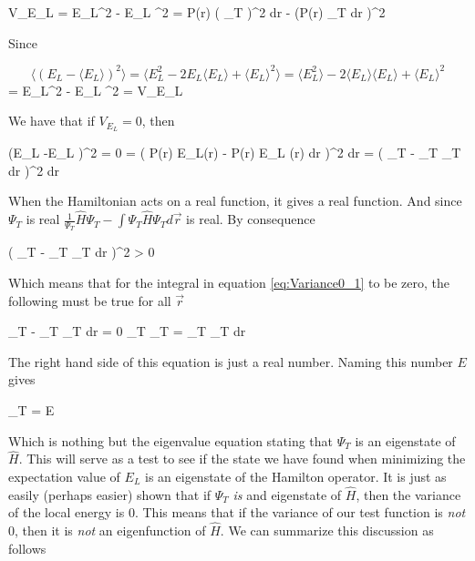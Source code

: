 \eqs
V_{E_L} = \langle E_L^2 \rangle - \langle E_L \rangle^2
= 
\int P(\vec r) \left (  \Psi_T \right )^2 d\vec r -
\left (\int P(\vec r)   \Psi_T d\vec r \right )^2
\eqf 

Since

\[
\langle (E_L -\langle E_L \rangle)^2 \rangle = \langle E_L^2 - 2 E_L \langle E_L \rangle + \langle E_L \rangle^2 \rangle 
=  
\langle E_L^2 \rangle - 2 \langle E_L \rangle \langle E_L \rangle + \langle E_L \rangle^2
\]
\eqs
= \langle E_L^2 \rangle - \langle E_L \rangle^2 
=
V_{E_L}
\eqf

We have that if $V_{E_L} = 0$, then 

\eqs
\langle (E_L -\langle E_L \rangle)^2 \rangle = 0
\eqf
{} = \int  \left (  P(\vec r) E_L(\vec r) -  \int P(\vec r) E_L (\vec r) d\vec r \right )^2 d\vec r = 
\int \left (
  \Psi_T  - \int \Psi_T  \Psi_T d\vec r 
\right )^2 d\vec r
\label{eq:Variance0_1}
\eqf

When the Hamiltonian acts on a real function, it gives a real function. 
And since $\Psi_T$ is real $\frac{1}{\Psi_T} \hat{H} \Psi_T  - \int \Psi_T \hat{H} \Psi_T d\vec r$ is real. 
By consequence

\eqs 
\left (
  \Psi_T  - \int \Psi_T  \Psi_T d\vec r 
\right )^2 > 0
\eqf

Which means that for the integral in equation \ref{eq:Variance0_1} to be zero, the following must be true for all $\vec r$

\eqs
{}  \Psi_T  - \int \Psi_T  \Psi_T d\vec r  = 0
\eqf
\eqs
\Psi_T  \Psi_T = \int \Psi_T  \Psi_T d\vec r 
\eqf

The right hand side of this equation is just a real number. 
Naming this number $E$ gives 

\eqs
{}  \Psi_T = E 
\eqf
\eqs {}  \eqf

Which is nothing but the eigenvalue equation stating that $\Psi_T$ is an eigenstate of $\hat{H}$.
This will serve as a test to see if the state we have found when minimizing the expectation value of $E_L$ is an eigenstate of the Hamilton operator. 
It is just as easily (perhaps easier) shown that if $\Psi_T$ \textit{is} and eigenstate of $\hat{H}$, then the variance of the local energy is $0$. 
This means that if the variance of our test function is \textit{not} $0$, then it is \textit{not} an eigenfunction of $\hat{H}$. 
We can summarize this discussion as follows

